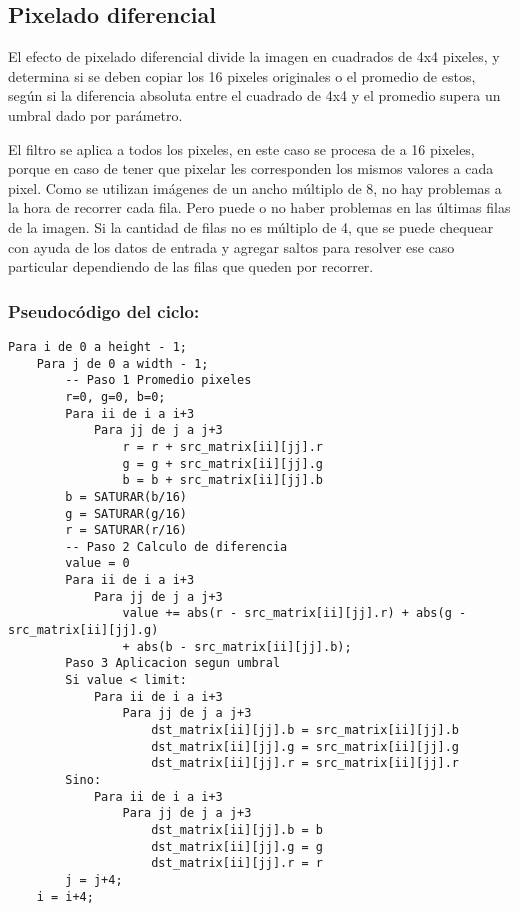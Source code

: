 \subsection{Pixelado diferencial}
El efecto de pixelado diferencial divide la imagen en cuadrados de 4x4 pixeles, y determina si se deben copiar los 16 pixeles originales o el promedio de estos, según si la diferencia absoluta entre el cuadrado de 4x4 y el promedio supera un umbral dado por parámetro. \\

\medskip

El filtro se aplica a todos los pixeles, en este caso se procesa de a 16 pixeles, porque en caso de tener que pixelar les corresponden los mismos valores a cada pixel. 
Como se utilizan imágenes de un ancho múltiplo de 8, no hay problemas a la hora de recorrer cada fila. Pero puede o no haber problemas en las últimas filas de la imagen. Si la cantidad de filas no es múltiplo de 4, que se puede chequear con ayuda de los datos de entrada y agregar saltos para resolver ese caso particular dependiendo de las filas que queden por recorrer. \\
\subsubsection{Pseudocódigo del ciclo:}
\begin{codesnippet}
\begin{verbatim}
Para i de 0 a height - 1;
    Para j de 0 a width - 1; 
        -- Paso 1 Promedio pixeles
        r=0, g=0, b=0;
        Para ii de i a i+3
            Para jj de j a j+3
                r = r + src_matrix[ii][jj].r
                g = g + src_matrix[ii][jj].g
                b = b + src_matrix[ii][jj].b
        b = SATURAR(b/16)
        g = SATURAR(g/16)
        r = SATURAR(r/16)
        -- Paso 2 Calculo de diferencia
        value = 0
        Para ii de i a i+3
            Para jj de j a j+3
                value += abs(r - src_matrix[ii][jj].r) + abs(g - src_matrix[ii][jj].g) 
                + abs(b - src_matrix[ii][jj].b);
        Paso 3 Aplicacion segun umbral
        Si value < limit:
            Para ii de i a i+3
                Para jj de j a j+3
                    dst_matrix[ii][jj].b = src_matrix[ii][jj].b
                    dst_matrix[ii][jj].g = src_matrix[ii][jj].g
                    dst_matrix[ii][jj].r = src_matrix[ii][jj].r
        Sino:
            Para ii de i a i+3
                Para jj de j a j+3
                    dst_matrix[ii][jj].b = b
                    dst_matrix[ii][jj].g = g
                    dst_matrix[ii][jj].r = r
        j = j+4;
    i = i+4;
\end{verbatim}
\end{codesnippet}


